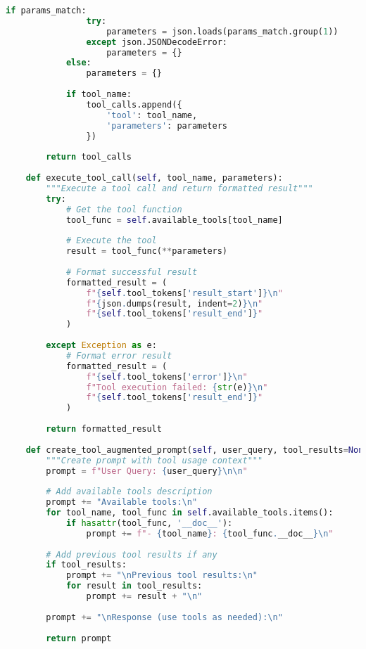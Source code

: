 \begin{lstlisting}[language=Python, caption=Basic tool invocation token system]
            if params_match:
                try:
                    parameters = json.loads(params_match.group(1))
                except json.JSONDecodeError:
                    parameters = {}
            else:
                parameters = {}
            
            if tool_name:
                tool_calls.append({
                    'tool': tool_name,
                    'parameters': parameters
                })
        
        return tool_calls
    
    def execute_tool_call(self, tool_name, parameters):
        """Execute a tool call and return formatted result"""
        try:
            # Get the tool function
            tool_func = self.available_tools[tool_name]
            
            # Execute the tool
            result = tool_func(**parameters)
            
            # Format successful result
            formatted_result = (
                f"{self.tool_tokens['result_start']}\n"
                f"{json.dumps(result, indent=2)}\n"
                f"{self.tool_tokens['result_end']}"
            )
            
        except Exception as e:
            # Format error result
            formatted_result = (
                f"{self.tool_tokens['error']}\n"
                f"Tool execution failed: {str(e)}\n"
                f"{self.tool_tokens['result_end']}"
            )
        
        return formatted_result
    
    def create_tool_augmented_prompt(self, user_query, tool_results=None):
        """Create prompt with tool usage context"""
        prompt = f"User Query: {user_query}\n\n"
        
        # Add available tools description
        prompt += "Available tools:\n"
        for tool_name, tool_func in self.available_tools.items():
            if hasattr(tool_func, '__doc__'):
                prompt += f"- {tool_name}: {tool_func.__doc__}\n"
        
        # Add previous tool results if any
        if tool_results:
            prompt += "\nPrevious tool results:\n"
            for result in tool_results:
                prompt += result + "\n"
        
        prompt += "\nResponse (use tools as needed):\n"
        
        return prompt
\end{lstlisting}

